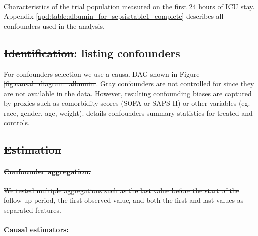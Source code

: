 \documentclass[10pt,letterpaper]{article}
\providecommand{\DIFaddtex}[1]{{\protect\color{blue}\uwave{#1}}} %
\providecommand{\DIFdeltex}[1]{{\protect\color{red}\sout{#1}}}                      %
\providecommand{\DIFaddbegin}{} %
\providecommand{\DIFaddend}{} %
\providecommand{\DIFdelbegin}{} %
\providecommand{\DIFdelend}{} %
\providecommand{\DIFadd}[1]{\texorpdfstring{\DIFaddtex{#1}}{#1}} %
\providecommand{\DIFdel}[1]{\texorpdfstring{\DIFdeltex{#1}}{}} %
\newcommand{\DIFscaledelfig}{0.5}
\newlength{\DIFdelgraphicswidth} %
\newlength{\DIFdelgraphicsheight} %
\newcommand{\DIFaddincludegraphics}[2][]{{\color{blue}\fbox{\DIFOincludegraphics[#1]{#2}}}} %
\newcommand{\DIFdelincludegraphics}[2][]{%
\sbox{\DIFdelgraphicsbox}{\DIFOincludegraphics[#1]{#2}}%
\settoboxwidth{\DIFdelgraphicswidth}{\DIFdelgraphicsbox} %
\settoboxtotalheight{\DIFdelgraphicsheight}{\DIFdelgraphicsbox} %
\scalebox{\DIFscaledelfig}{%
\parbox[b]{\DIFdelgraphicswidth}{\usebox{\DIFdelgraphicsbox}\\[-\baselineskip] \rule{\DIFdelgraphicswidth}{0em}}\llap{\resizebox{\DIFdelgraphicswidth}{\DIFdelgraphicsheight}{%
\setlength{\unitlength}{\DIFdelgraphicswidth}%
\begin{picture}(1,1)%
\thicklines\linethickness{2pt} %
{\color[rgb]{1,0,0}\put(0,0){\framebox(1,1){}}}%
{\color[rgb]{1,0,0}\put(0,0){\line( 1,1){1}}}%
{\color[rgb]{1,0,0}\put(0,1){\line(1,-1){1}}}%
\end{picture}%
}\hspace*{3pt}}} %
} %
\DeclareRobustCommand{\DIFaddbegin}{\DIFOaddbegin \let\includegraphics\DIFaddincludegraphics} %
\DeclareRobustCommand{\DIFaddend}{\DIFOaddend \let\includegraphics\DIFOincludegraphics} %
\DeclareRobustCommand{\DIFdelbegin}{\DIFOdelbegin \let\includegraphics\DIFdelincludegraphics} %
\DeclareRobustCommand{\DIFdelend}{\DIFOaddend \let\includegraphics\DIFOincludegraphics} %
\begin{document}
\begin{table}[h!]
  \centering\small
  \resizebox{\columnwidth}{!}{
  }
  \\[.5ex]

  \caption{Characteristics of the trial population measured on the first 24
    hours of ICU stay. Appendix \ref{apd:table:albumin_for_sepsis:table1_complete}
    describes all confounders used in the analysis.}\label{table:albumin_for_sepsis:table1_simple}
\end{table}


\subsection*{\DIFdelbegin \DIFdel{Identification}\DIFdelend \DIFaddbegin \DIFadd{Step 2}\DIFaddend : \DIFaddbegin \DIFadd{Identification -- }\DIFaddend listing confounders}\label{sec:identification_mimic_iv}

For confounders selection we use a causal DAG shown in Figure
\DIFdelbegin \DIFdel{\ref{fig:causal_diagram_albumin}}\DIFdelend \DIFaddbegin {}\DIFaddend . Gray confounders are not controlled for since
they are not available in the data. However, resulting confounding biases are
captured by proxies such as comorbidity scores (SOFA or SAPS II) or other
variables (eg. race, gender, age, weight).
%
 details confounders
summary statistics for treated and controls.


\DIFdelbegin \subsection*{\DIFdel{Estimation}}%

\paragraph{\DIFdel{Confounder aggregation:}}
\addtocounter{paragraph}{-1}%

\DIFdel{We tested multiple aggregations such as the last value before the start of the
follow-up period, the first observed value, and both the first and last values as
separated features.
}%

\DIFdelend \paragraph{Causal estimators:}
\end{document}
